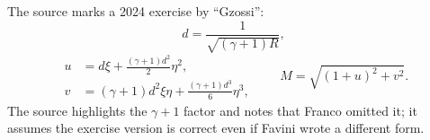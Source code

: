 \documentclass[11pt]{article}
\begin{document}
The source marks a 2024 exercise by ``Gzossi'':
\[
d=\frac{1}{\sqrt{(\gamma+1)R}},
\]
\[
\begin{aligned}
u&=d\xi+\frac{(\gamma+1)d^2}{2}\eta^2,\\
v&=(\gamma+1)d^2\xi\eta
+\frac{(\gamma+1)d^3}{6}\eta^3,
\end{aligned}
\qquad
M=\sqrt{(1+u)^2+v^2}.
\]
The source highlights the \(\gamma+1\) factor and notes that Franco omitted
it; it assumes the exercise version is correct even if Favini wrote a
different form.

\end{document}
